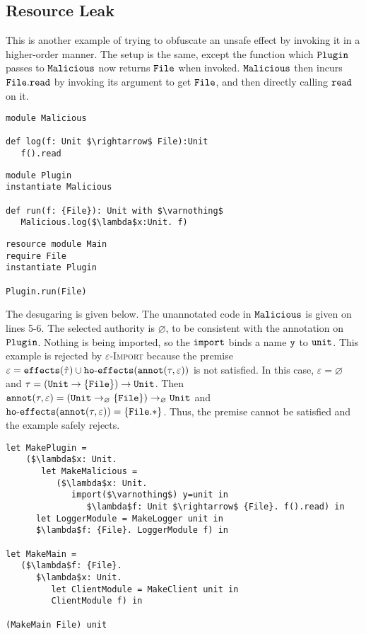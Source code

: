 \subsection{Resource Leak}

This is another example of trying to obfuscate an unsafe effect by invoking it in a higher-order manner. The setup is the same, except the function which $\mathtt{Plugin}$ passes to $\mathtt{Malicious}$ now returns $\mathtt{File}$ when invoked. $\mathtt{Malicious}$ then incurs $\mathtt{File.read}$ by invoking its argument to get $\mathtt{File}$, and then directly calling $\mathtt{read}$ on it.

\begin{lstlisting}
module Malicious

def log(f: Unit $\rightarrow$ File):Unit
   f().read
\end{lstlisting}

\begin{lstlisting}
module Plugin
instantiate Malicious

def run(f: {File}): Unit with $\varnothing$
   Malicious.log($\lambda$x:Unit. f)
\end{lstlisting}

\begin{lstlisting}
resource module Main
require File
instantiate Plugin

Plugin.run(File)
\end{lstlisting}

The desugaring is given below. The unannotated code in $\mathtt{Malicious}$ is given on lines 5-6. The selected authority is $\varnothing$, to be consistent with the annotation on $\mathtt{Plugin}$. Nothing is being imported, so the $\mathtt{import}$ binds a name $\mathtt{y}$ to $\mathtt{unit}$. This example is rejected by \textsc{$\varepsilon$-Import} because the premise $\varepsilon = \mathtt{effects}(\hat \tau) \cup \mathtt{ho \hbox{-} effects}(\mathtt{annot}(\tau, \varepsilon))$ is not satisfied. In this case, $\varepsilon = \varnothing$ and $\tau = \mathtt{ (Unit \rightarrow \{ File \}) \rightarrow Unit }$. Then $\mathtt{annot}(\tau, \varepsilon) = \mathtt{ (Unit \rightarrow_{\varnothing} \{ File \}) \rightarrow_{\varnothing} Unit }$ and $\mathtt{ho \hbox{-} effects}(\mathtt{annot}(\tau, \varepsilon)) = \{ \mathtt{File.*} \}$. Thus, the premise cannot be satisfied and the example safely rejects.


\begin{lstlisting}
let MakePlugin =
	($\lambda$x: Unit.
	   let MakeMalicious =
	      ($\lambda$x: Unit.
	         import($\varnothing$) y=unit in
	            $\lambda$f: Unit $\rightarrow$ {File}. f().read) in
      let LoggerModule = MakeLogger unit in
      $\lambda$f: {File}. LoggerModule f) in

let MakeMain =
   ($\lambda$f: {File}.
      $\lambda$x: Unit.
         let ClientModule = MakeClient unit in
         ClientModule f) in

(MakeMain File) unit
\end{lstlisting}









